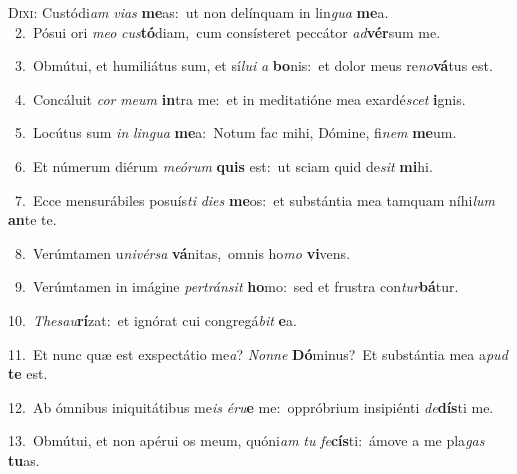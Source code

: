 \lettrine{\initial\textcolor{\initialcolor}{D}}{ixi:} Custódi\textit{am} \textit{vi}\-\textit{as} \textbf{me}\-as:~\star ut non delínquam in lin\textit{gua} \textbf{me}\-a.\\
{\numbfont\textcolor{\numbcolor}{~2.}}~Pósui ori \textit{me}\-\textit{o} \textit{cus}\-\textbf{tó}diam,~\star cum consísteret peccátor \textit{ad}\-\textbf{vér}sum me.\par
{\numbfont\textcolor{\numbcolor}{~3.}}~Obmútui, et humiliátus sum, et sí\-\textit{lu}\-\textit{i} \textit{a} \textbf{bo}\-nis:~\star et dolor meus re\-\textit{no}\-\textbf{vá}tus est.\par
{\numbfont\textcolor{\numbcolor}{~4.}}~Concáluit \textit{cor} \textit{me}\-\textit{um} \textbf{in}\-tra me:~\star et in meditatióne mea exardé\textit{scet} \textbf{i}\-gnis.\par
{\numbfont\textcolor{\numbcolor}{~5.}}~Locútus sum \textit{in} \textit{lin}\-\textit{gua} \textbf{me}\-a:~\star Notum fac mihi, Dómine, fi\textit{nem} \textbf{me}\-um.\par
{\numbfont\textcolor{\numbcolor}{~6.}}~Et númerum diérum \textit{me}\-\textit{ó}\textit{rum} \textbf{quis} est:~\star ut sciam quid de\textit{sit} \textbf{mi}\-hi.\par
{\numbfont\textcolor{\numbcolor}{~7.}}~Ecce mensurábiles posuís\textit{ti} \textit{di}\-\textit{es} \textbf{me}\-os:~\star et substántia mea tamquam níhi\textit{lum} \textbf{an}\-te te.\par
{\numbfont\textcolor{\numbcolor}{~8.}}~Verúmtamen u\-\textit{ni}\-\textit{vér}\textit{sa} \textbf{vá}\-nitas,~\star omnis ho\textit{mo} \textbf{vi}\-vens.\par
{\numbfont\textcolor{\numbcolor}{~9.}}~Verúmtamen in imágine \textit{per}\-\textit{tráns}\textit{it} \textbf{ho}\-mo:~\star sed et frustra con\-\textit{tur}\-\textbf{bá}tur.\par
{\numbfont\textcolor{\numbcolor}{10.}}~\-\textit{The}\-\textit{sau}\textbf{rí}zat:~\star et ignórat cui congregá\textit{bit} \textbf{e}\-a.\par
{\numbfont\textcolor{\numbcolor}{11.}}~Et nunc quæ est exspectátio me\-\textit{a}\-? \textit{Non}\-\textit{ne} \textbf{Dó}\-minus?~\star Et substántia mea a\textit{pud} \textbf{te} est.\par
{\numbfont\textcolor{\numbcolor}{12.}}~Ab ómnibus iniquitátibus me\textit{is} \textit{é}\-\textit{ru}\textbf{e} me:~\star oppróbrium insipiénti \textit{de}\-\textbf{dís}ti me.\par
{\numbfont\textcolor{\numbcolor}{13.}}~Obmútui, et non apérui os meum, quóni\textit{am} \textit{tu} \textit{fe}\-\textbf{cís}ti:~\star ámove a me pla\textit{gas} \textbf{tu}\-as.\par
